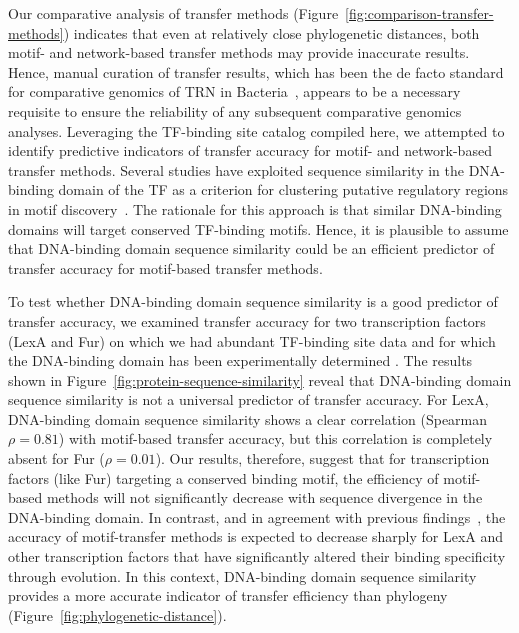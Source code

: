 Our comparative analysis of transfer methods
(Figure~\ref{fig:comparison-transfer-methods}) indicates that even at
relatively close phylogenetic distances, both motif- and network-based transfer
methods may provide inaccurate results. Hence, manual curation of transfer
results, which has been the de facto standard for comparative genomics of TRN
in Bacteria~\cite{tan2001comparative, erill2004differences,
  gelfand2000comparative, novichkov2010regpredict}, appears to be a necessary
requisite to ensure the reliability of any subsequent comparative genomics
analyses. Leveraging the TF-binding site catalog compiled here, we attempted to
identify predictive indicators of transfer accuracy for motif- and
network-based transfer methods. Several studies have exploited sequence
similarity in the DNA-binding domain of the TF as a criterion for clustering
putative regulatory regions in motif discovery~\cite{francke2008generic,
  ravcheev2014comparative, dufour2010reconstruction, sahota2010novel}. The
rationale for this approach is that similar DNA-binding domains will target
conserved TF-binding motifs. Hence, it is plausible to assume that DNA-binding
domain sequence similarity could be an efficient predictor of transfer accuracy
for motif-based transfer methods.

To test whether DNA-binding domain sequence similarity is a good predictor of
transfer accuracy, we examined transfer accuracy for two transcription factors
(LexA and Fur) on which we had abundant TF-binding site data and for which the
DNA-binding domain has been experimentally determined
\cite{pohl2003architecture, zhang2010structure}. The results shown in
Figure~\ref{fig:protein-sequence-similarity} reveal that DNA-binding domain
sequence similarity is not a universal predictor of transfer accuracy. For
LexA, DNA-binding domain sequence similarity shows a clear correlation
(Spearman $\rho=0.81$) with motif-based transfer accuracy, but this correlation
is completely absent for Fur ($\rho=0.01$). Our results, therefore, suggest
that for transcription factors (like Fur) targeting a conserved binding motif,
the efficiency of motif-based methods will not significantly decrease with
sequence divergence in the DNA-binding domain. In contrast, and in agreement
with previous findings~\cite{yu2004annotation}, the accuracy of motif-transfer
methods is expected to decrease sharply for LexA and other transcription
factors that have significantly altered their binding specificity through
evolution. In this context, DNA-binding domain sequence similarity provides a
more accurate indicator of transfer efficiency than phylogeny
(Figure~\ref{fig:phylogenetic-distance}).

